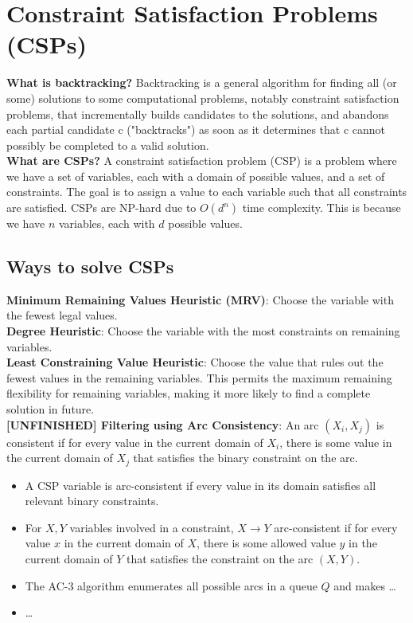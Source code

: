 \section{Constraint Satisfaction Problems (CSPs)}
\textbf{What is backtracking?} Backtracking is a general algorithm for finding all (or some) solutions to some computational problems, notably constraint satisfaction problems, that incrementally builds candidates to the solutions, and abandons each partial candidate c ("backtracks") as soon as it determines that c cannot possibly be completed to a valid solution.\\
\textbf{What are CSPs?} A constraint satisfaction problem (CSP) is a problem where we have a set of variables, each with a domain of possible values, and a set of constraints. The goal is to assign a value to each variable such that all constraints are satisfied. CSPs are NP-hard due to $O(d^n)$ time complexity. This is because we have $n$ variables, each with $d$ possible values.\\

\subsection{Ways to solve CSPs}
\textbf{Minimum Remaining Values Heuristic (MRV)}: Choose the variable with the fewest legal values.\\
\textbf{Degree Heuristic}: Choose the variable with the most constraints on remaining variables.\\
\textbf{Least Constraining Value Heuristic}: Choose the value that rules out the fewest values in the remaining variables. This permits the maximum remaining flexibility for remaining variables, making it more likely to find a complete solution in future.\\
\textbf{[UNFINISHED] Filtering using Arc Consistency}: An arc $(X_i, X_j)$ is consistent if for every value in the current domain of $X_i$, there is some value in the current domain of $X_j$ that satisfies the binary constraint on the arc.\\
\begin{itemize}
    \item A CSP variable is arc-consistent if every value in its domain satisfies all relevant binary constraints.
    \item For $X, Y$ variables involved in a constraint, $X \rightarrow Y$ arc-consistent if for every value $x$ in the current domain of $X$, there is some allowed value $y$ in the current domain of $Y$ that satisfies the constraint on the arc $(X, Y)$.
    \item The AC-3 algorithm enumerates all possible arcs in a queue $Q$ and makes \dots
    \item \dots
\end{itemize}

